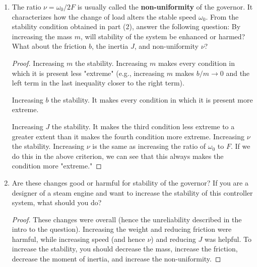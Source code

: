 \documentclass[../psets.tex]{subfiles}
\begin{document}
\begin{enumerate}
\begin{enumerate}
        \item The ratio $\nu=\omega_0/2F$ is usually called the \textbf{non-uniformity} of the governor. It characterizes how the change of load alters the stable speed $\omega_0$. From the stability condition obtained in part (2), answer the following question: By increasing the mass $m$, will stability of the system be enhanced or harmed? What about the friction $b$, the inertia $J$, and non-uniformity $\nu$?
        \begin{proof}
            Increasing $m$  the stability. Increasing $m$ makes every condition in which it is present less "extreme" (e.g., increasing $m$ makes $b/m\to 0$ and the left term in the last inequality closer to the right term).\par
            Increasing $b$  the stability. It makes every condition in which it is present more extreme.\par
            Increasing $J$  the stability. It makes the third condition less extreme to a greater extent than it makes the fourth condition more extreme.
            Increasing $\nu$  the stability. Increasing $\nu$ is the same as increasing the ratio of $\omega_0$ to $F$. If we do this in the above criterion, we can see that this always makes the condition more "extreme."
        \end{proof}
        \item Are these changes good or harmful for stability of the governor? If you are a designer of a steam engine and want to increase the stability of this controller system, what should you do?
        \begin{proof}
            These changes were overall  (hence the unreliability described in the intro to the question). Increasing the weight and reducing friction were harmful, while increasing speed (and hence $\nu$) and reducing $J$ was helpful. To increase the stability, you should decrease the mass, increase the friction, decrease the moment of inertia, and increase the non-uniformity.
        \end{proof}
    \end{enumerate}
\end{enumerate}
\end{document}

